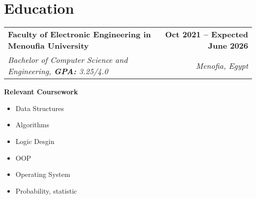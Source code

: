 \documentclass[letterpaper,11pt]{article}
\makeatletter
\newcommand{\resumeSubheading}[4]{
  \vspace{-2pt}\item
    \begin{tabular*}{1.0\textwidth}[t]{l@{\extracolsep{\fill}}r}
      \textbf{#1} & \textbf{\small #2} \\
      \textit{\small#3} & \textit{\small #4} \\
    \end{tabular*}\vspace{-7pt}
}
\newcommand{\resumeSubHeadingListStart}{\begin{itemize}[leftmargin=0.0in, label={}]}
\newcommand{\resumeSubHeadingListEnd}{\end{itemize}}
\makeatother
\begin{document}
\section{Education}
  \resumeSubHeadingListStart
    \resumeSubheading
      {Faculty of Electronic Engineering in Menoufia University}{Oct 2021 -- Expected June 2026}
      {Bachelor of Computer Science and Engineering, \textbf{GPA:} 3.25/4.0}{Menofia, Egypt}
      \vspace{-6pt}
      {\item {\textbf{Relevant Coursework}}}
      \begin{multicols}{4}
            \begin{itemize}[itemsep=-5pt, parsep=3pt]
                \item\small Data Structures
                \item Algorithms
                \item Logic Desgin
                \item OOP
                \item Operating System
                \item Probability, statistic
            \end{itemize}
        \end{multicols}
        \vspace*{2.0\multicolsep}
        \vspace{0pt}

  \resumeSubHeadingListEnd

\end{document}
